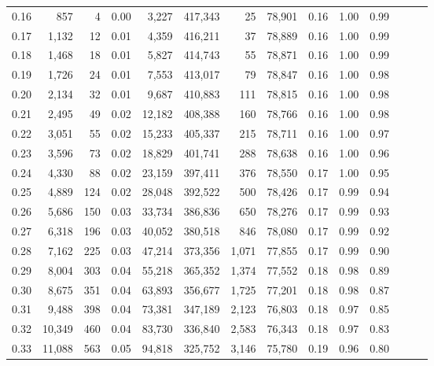\begin{tabular}{rrrrrrrrrrrrrr}
0.16 &     857 &      4 &  0.00 &    3,227 &  417,343 &      25 &  78,901 &  0.16 &  1.00 &      0.99 \\
0.17 &   1,132 &     12 &  0.01 &    4,359 &  416,211 &      37 &  78,889 &  0.16 &  1.00 &      0.99 \\
0.18 &   1,468 &     18 &  0.01 &    5,827 &  414,743 &      55 &  78,871 &  0.16 &  1.00 &      0.99 \\
0.19 &   1,726 &     24 &  0.01 &    7,553 &  413,017 &      79 &  78,847 &  0.16 &  1.00 &      0.98 \\
0.20 &   2,134 &     32 &  0.01 &    9,687 &  410,883 &     111 &  78,815 &  0.16 &  1.00 &      0.98 \\
0.21 &   2,495 &     49 &  0.02 &   12,182 &  408,388 &     160 &  78,766 &  0.16 &  1.00 &      0.98 \\
0.22 &   3,051 &     55 &  0.02 &   15,233 &  405,337 &     215 &  78,711 &  0.16 &  1.00 &      0.97 \\
0.23 &   3,596 &     73 &  0.02 &   18,829 &  401,741 &     288 &  78,638 &  0.16 &  1.00 &      0.96 \\
0.24 &   4,330 &     88 &  0.02 &   23,159 &  397,411 &     376 &  78,550 &  0.17 &  1.00 &      0.95 \\
0.25 &   4,889 &    124 &  0.02 &   28,048 &  392,522 &     500 &  78,426 &  0.17 &  0.99 &      0.94 \\
0.26 &   5,686 &    150 &  0.03 &   33,734 &  386,836 &     650 &  78,276 &  0.17 &  0.99 &      0.93 \\
0.27 &   6,318 &    196 &  0.03 &   40,052 &  380,518 &     846 &  78,080 &  0.17 &  0.99 &      0.92 \\
0.28 &   7,162 &    225 &  0.03 &   47,214 &  373,356 &   1,071 &  77,855 &  0.17 &  0.99 &      0.90 \\
0.29 &   8,004 &    303 &  0.04 &   55,218 &  365,352 &   1,374 &  77,552 &  0.18 &  0.98 &      0.89 \\
0.30 &   8,675 &    351 &  0.04 &   63,893 &  356,677 &   1,725 &  77,201 &  0.18 &  0.98 &      0.87 \\
0.31 &   9,488 &    398 &  0.04 &   73,381 &  347,189 &   2,123 &  76,803 &  0.18 &  0.97 &      0.85 \\
0.32 &  10,349 &    460 &  0.04 &   83,730 &  336,840 &   2,583 &  76,343 &  0.18 &  0.97 &      0.83 \\
0.33 &  11,088 &    563 &  0.05 &   94,818 &  325,752 &   3,146 &  75,780 &  0.19 &  0.96 &      0.80 \\

\end{tabular}
